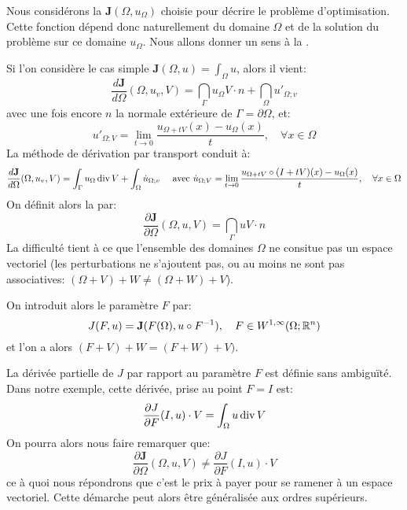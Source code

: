 \medskip
Nous considérons la  ${\mathbf J}(\Omega, u_\Omega)$ choisie
pour décrire le problème d'optimisation. Cette fonction dépend donc naturellement
du domaine $\Omega$ et de la solution du problème sur ce domaine $u_\Omega$.
Nous allons donner un sens à la .

\medskip
Si l'on considère le cas simple ${\mathbf J}(\Omega,u)=\int_\Omega u$, alors il vient:
\begin{equation}
\dfrac{d{\mathbf J}}{d\Omega}(\Omega, u_v,V)=\dint_\Gamma u_\Omega V\cdot n + \dint_\Omega u'_{\Omega;v}
\end{equation}
avec une fois encore $n$ la normale extérieure de $\Gamma=\partial\Omega$, et:
\begin{equation}
u'_{\Omega;V}=\lim_{t\rightarrow0} \dfrac{u_{\Omega+tV}(x)-u_\Omega(x)}t, \quad\forall x\in\Omega
\end{equation}
La méthode de dérivation par transport conduit à:
\begin{equation}
\dfrac{d{\mathbf J}}{d\Omega}(\Omega, u_v,V)=\displaystyle\int_\Gamma u_\Omega \operatorname{div} V + \displaystyle\int_\Omega \dot{u}_{\Omega;v}
\quad \text{ avec }
\dot{u}_{\Omega;V}=\lim_{t\rightarrow0} \dfrac{u_{\Omega+tV}\circ (I+tV)(x)-u_\Omega(x)}t,\quad \forall x\in\Omega
\end{equation}
On définit alors la 
par:
\begin{equation}
\dfrac{\partial{\mathbf J}}{\partial\Omega}(\Omega, u,V) = \dint_\Gamma u V\cdot n
\end{equation}
La difficulté tient à ce que l'ensemble des domaines $\Omega$ ne consitue pas un espace vectoriel
(les perturbations ne s'ajoutent pas, ou au moins ne sont pas associatives:
$(\Omega+V)+W\ne(\Omega+W)+V$).

\medskip
{}
On introduit alors le paramètre $F$ par:
\begin{equation}
J(F,u)={\mathbf J}(F(\Omega),u\circ F^{-1}),\quad F\in W^{1,\infty}(\Omega;\mathbb R^n)
\end{equation}
et l'on a alors $(F+V)+W=(F+W)+V)$.

La dérivée partielle de $J$ par rapport au paramètre $F$ est définie sans ambiguïté.
Dans notre exemple, cette dérivée, prise au point $F=I$ est:
\begin{equation}
\dfrac{\partial J}{\partial F}(I,u)\cdot V = \displaystyle\int_\Omega u \operatorname{div} V
\end{equation}
On pourra alors nous faire remarquer que:
\begin{equation}
\dfrac{\partial{\mathbf J}}{\partial\Omega}(\Omega, u,V)
\ne
\dfrac{\partial J}{\partial F}(I,u)\cdot V
\end{equation}
ce à quoi nous répondrons que c'est le prix à payer pour se ramener à un espace
vectoriel.
Cette démarche peut alors être généralisée aux ordres supérieurs.

